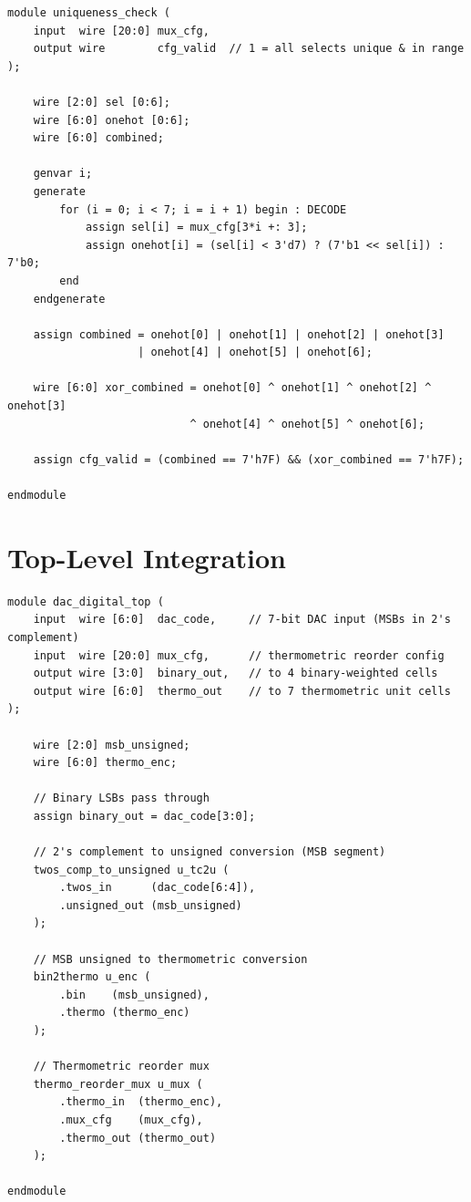\documentclass[11pt,a4paper]{article}
\begin{document}
\begin{lstlisting}[caption={Configuration Uniqueness Checker}]
module uniqueness_check (
    input  wire [20:0] mux_cfg,
    output wire        cfg_valid  // 1 = all selects unique & in range
);

    wire [2:0] sel [0:6];
    wire [6:0] onehot [0:6];
    wire [6:0] combined;

    genvar i;
    generate
        for (i = 0; i < 7; i = i + 1) begin : DECODE
            assign sel[i] = mux_cfg[3*i +: 3];
            assign onehot[i] = (sel[i] < 3'd7) ? (7'b1 << sel[i]) : 7'b0;
        end
    endgenerate

    assign combined = onehot[0] | onehot[1] | onehot[2] | onehot[3]
                    | onehot[4] | onehot[5] | onehot[6];

    wire [6:0] xor_combined = onehot[0] ^ onehot[1] ^ onehot[2] ^ onehot[3]
                            ^ onehot[4] ^ onehot[5] ^ onehot[6];

    assign cfg_valid = (combined == 7'h7F) && (xor_combined == 7'h7F);

endmodule
\end{lstlisting}

\section{Top-Level Integration}

\begin{lstlisting}[caption={DAC Digital Top-Level}]
module dac_digital_top (
    input  wire [6:0]  dac_code,     // 7-bit DAC input (MSBs in 2's complement)
    input  wire [20:0] mux_cfg,      // thermometric reorder config
    output wire [3:0]  binary_out,   // to 4 binary-weighted cells
    output wire [6:0]  thermo_out    // to 7 thermometric unit cells
);

    wire [2:0] msb_unsigned;
    wire [6:0] thermo_enc;

    // Binary LSBs pass through
    assign binary_out = dac_code[3:0];

    // 2's complement to unsigned conversion (MSB segment)
    twos_comp_to_unsigned u_tc2u (
        .twos_in      (dac_code[6:4]),
        .unsigned_out (msb_unsigned)
    );

    // MSB unsigned to thermometric conversion
    bin2thermo u_enc (
        .bin    (msb_unsigned),
        .thermo (thermo_enc)
    );

    // Thermometric reorder mux
    thermo_reorder_mux u_mux (
        .thermo_in  (thermo_enc),
        .mux_cfg    (mux_cfg),
        .thermo_out (thermo_out)
    );

endmodule
\end{lstlisting}
\end{document}
